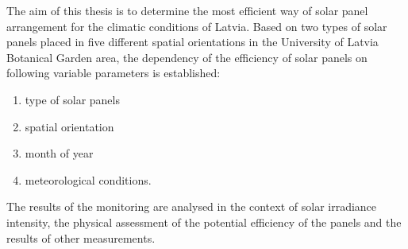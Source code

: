 The aim of this thesis is to determine the most efficient way of solar panel arrangement for the climatic conditions of Latvia.
Based on two types of solar panels placed in five different spatial orientations in the University of Latvia Botanical Garden area, the dependency of the efficiency of solar panels on following variable parameters is established:
\begin{enumerate}
\item type of solar panels
\item spatial orientation
\item month of year
\item meteorological conditions.
\end{enumerate}

The results of the monitoring are analysed in the context of solar irradiance intensity, the physical assessment of the potential efficiency of the panels and the results of other measurements.

